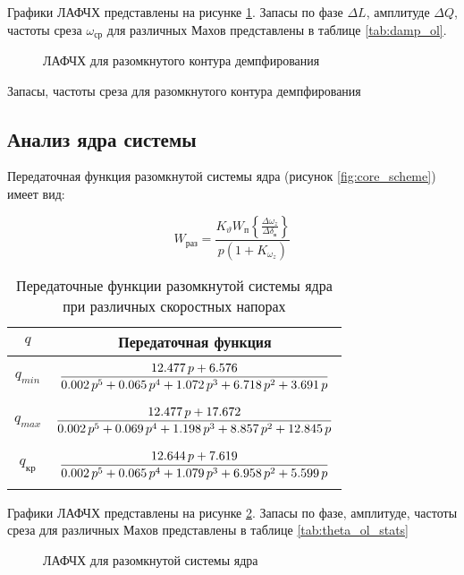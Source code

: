 Графики ЛАФЧХ представлены на рисунке \ref{fig:damp_ol}. Запасы по фазе
$\Delta L$, амплитуде $\Delta Q$, частоты среза $\omega_{ср}$ для различных
Махов представлены в таблице \ref{tab:damp_ol}.


\begin{figure}[H]
    \centering
    
    \caption{ЛАФЧХ для разомкнутого контура демпфирования}
    \label{fig:damp_ol}
\end{figure}

\begin{table}[H]
    \centering
    \caption{Запасы, частоты среза для разомкнутого контура демпфирования} 
    \label{tab:damp_ol}
    
\end{table}

\subsection{Анализ ядра системы}
Передаточная функция разомкнутой системы ядра (рисунок \ref{fig:core_scheme}) имеет вид:

\begin{equation}
    W_{раз} = \frac{K_\vartheta W_{п} \left\{\frac{\Delta \omega_z}{\Delta \delta_\text{в}} \right\}}{p(1 + K_{\omega_z}) }
\end{equation}

\begin{table}[H]
    \centering
    \caption{Передаточные функции разомкнутой системы ядра при различных скоростных напорах}
    \label{tab:core_tf_ol}
    \begin{tabular}{|c|c|}
    \hline
    $q$ & Передаточная функция\\ 
    \hline
    $q_{min}$& $\displaystyle \frac{12.477\,p+6.576}{0.002\,p^5+0.065\,p^4+1.072\,p^3+6.718\,p^2+3.691\,p} \addstrut{3em}$\\ 
    \hline
    $q_{max}$ & $\displaystyle \frac{12.477\,p+17.672}{0.002\,p^5+0.069\,p^4+1.198\,p^3+8.857\,p^2+12.845\,p}\addstrut{3em}$\\
    \hline
    $q_{кр}$ & $\displaystyle \frac{12.644\,p+7.619}{0.002\,p^5+0.065\,p^4+1.079\,p^3+6.958\,p^2+5.599\,p}\addstrut{3em}$ \\
    \hline
    \end{tabular}
\end{table}

Графики ЛАФЧХ представлены на рисунке \ref{fig:theta_ol}. Запасы по фазе, амплитуде, частоты среза для различных Махов представлены в таблице \ref{tab:theta_ol_stats}
\begin{figure}[H]
    \centering
    
    \caption{ЛАФЧХ для разомкнутой системы ядра}
    \label{fig:theta_ol}
\end{figure}

